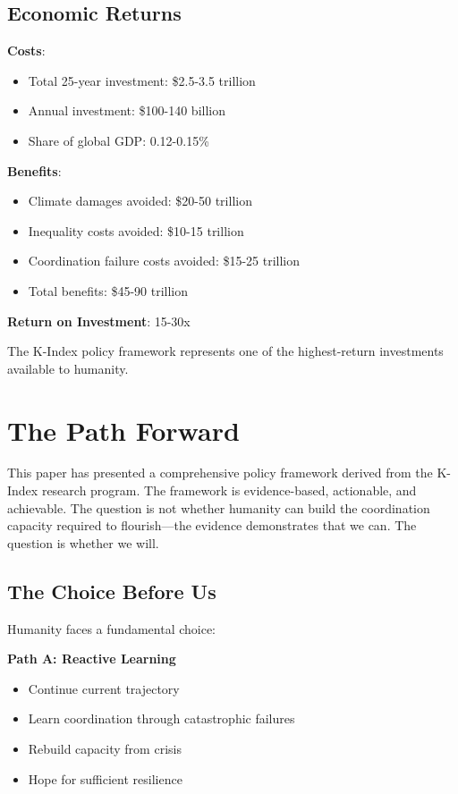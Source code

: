 \documentclass[12pt,letterpaper]{article}
\begin{document}
\subsection{Economic Returns}

\textbf{Costs}:
\begin{itemize}
    \item Total 25-year investment: \$2.5-3.5 trillion
    \item Annual investment: \$100-140 billion
    \item Share of global GDP: 0.12-0.15\%
\end{itemize}

\textbf{Benefits}:
\begin{itemize}
    \item Climate damages avoided: \$20-50 trillion
    \item Inequality costs avoided: \$10-15 trillion
    \item Coordination failure costs avoided: \$15-25 trillion
    \item Total benefits: \$45-90 trillion
\end{itemize}

\textbf{Return on Investment}: 15-30x

The K-Index policy framework represents one of the highest-return investments available to humanity.

\section{The Path Forward}

This paper has presented a comprehensive policy framework derived from the K-Index research program. The framework is evidence-based, actionable, and achievable. The question is not whether humanity can build the coordination capacity required to flourish---the evidence demonstrates that we can. The question is whether we will.

\subsection{The Choice Before Us}

Humanity faces a fundamental choice:

\textbf{Path A: Reactive Learning}
\begin{itemize}
    \item Continue current trajectory
    \item Learn coordination through catastrophic failures
    \item Rebuild capacity from crisis
    \item Hope for sufficient resilience
\end{itemize}
\end{document}
